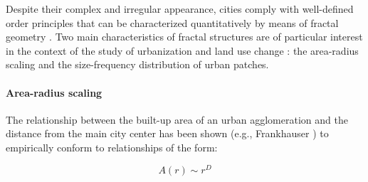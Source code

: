\documentclass[10pt,letterpaper]{article}
\begin{document}
Despite their complex and irregular appearance, cities comply with well-defined order principles that can be characterized quantitatively by means of fractal geometry \cite{frankhauser1994fractalite, batty1994fractal}.
Two main characteristics of fractal structures are of particular interest in the context of the study of urbanization and land use change \cite{white2015modeling}: the area-radius scaling and the size-frequency distribution of urban patches.

\paragraph*{Area-radius scaling}
The relationship between the built-up area of an urban agglomeration and the distance from the main city center has been shown (e.g., Frankhauser \cite{frankhauser1994fractalite}) to empirically conform to relationships of the form:

\begin{equation}
  \label{eq:radial-dimension}
  A(r) \sim r^D
\end{equation}
\end{document}

